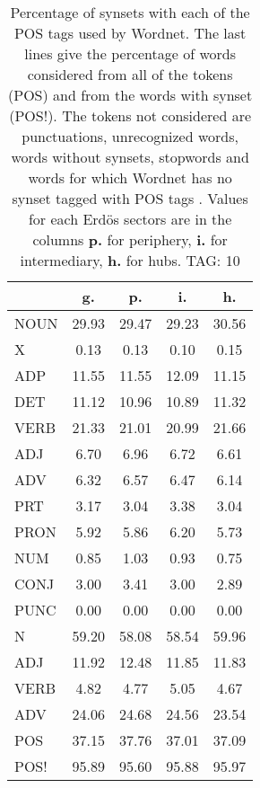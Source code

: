 \begin{table}[h!]
\begin{center}
\begin{tabular}{| l || c | c | c | c |}\hline
 & {\bf g.} & {\bf p.} & {\bf i.} & {\bf h.} \\\hline\hline
NOUN & 29.93  & 29.47  & 29.23  & 30.56 \\
X & 0.13  & 0.13  & 0.10  & 0.15 \\\hline
ADP & 11.55  & 11.55  & 12.09  & 11.15 \\
DET & 11.12  & 10.96  & 10.89  & 11.32 \\\hline
VERB & 21.33  & 21.01  & 20.99  & 21.66 \\\hline
ADJ & 6.70  & 6.96  & 6.72  & 6.61 \\
ADV & 6.32  & 6.57  & 6.47  & 6.14 \\\hline
PRT & 3.17  & 3.04  & 3.38  & 3.04 \\
PRON & 5.92  & 5.86  & 6.20  & 5.73 \\
NUM & 0.85  & 1.03  & 0.93  & 0.75 \\
CONJ & 3.00  & 3.41  & 3.00  & 2.89 \\
PUNC & 0.00  & 0.00  & 0.00  & 0.00 \\\hline\hline\hline
N & 59.20  & 58.08  & 58.54  & 59.96 \\\hline
ADJ & 11.92  & 12.48  & 11.85  & 11.83 \\\hline
VERB & 4.82  & 4.77  & 5.05  & 4.67 \\\hline
ADV & 24.06  & 24.68  & 24.56  & 23.54 \\\hline\hline
POS & 37.15  & 37.76  & 37.01  & 37.09 \\\hline
POS! & 95.89  & 95.60  & 95.88  & 95.97 \\\hline
\end{tabular}
\caption{Percentage of synsets with each of the POS tags used by Wordnet. The last lines give the percentage of words considered from all of the tokens (POS) and from the words with synset (POS!). The tokens not considered are punctuations, unrecognized words, words without synsets, stopwords and words for which Wordnet has no synset  tagged with POS tags . Values for each Erd\"os sectors are in the columns {{\bf p.}} for periphery, {{\bf i.}} for intermediary, {{\bf h.}} for hubs. TAG: 10}
\end{center}
\end{table}